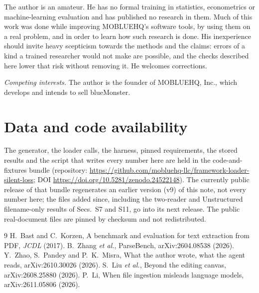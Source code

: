 \documentclass[aps,pre,twocolumn,superscriptaddress,nofootinbib,10pt]{revtex4-2}
\begin{document}
The author is an amateur. He has no formal training in statistics, econometrics or machine-learning evaluation and has published no research in them. Much of this work was done while improving MOBLUEHQ's software tools, by using them on a real problem, and in order to learn how such research is done. His inexperience should invite heavy scepticism towards the methods and the claims: errors of a kind a trained researcher would not make are possible, and the checks described here lower that risk without removing it. He welcomes corrections.

\emph{Competing interests.} The author is the founder of MOBLUEHQ, Inc., which develops and intends to sell blueMonster.

\section*{Data and code availability}
The generator, the loader calls, the harness, pinned requirements, the stored results and the script that writes every number here are held in the code-and-fixtures bundle (repository: \url{https://github.com/mobluehq-llc/framework-loader-silent-loss}; DOI \url{https://doi.org/10.5281/zenodo.24522148}). The currently public release of that bundle regenerates an earlier version (v9) of this note, not every number here; the files added since, including the two-reader and Unstructured filename-only results of Secs.~S7 and S11, go into its next release. The public real-document files are pinned by checksum and not redistributed.

\begin{thebibliography}{9}\footnotesize
{} H.~Bast and C.~Korzen, A benchmark and evaluation for text extraction from PDF, \emph{JCDL} (2017).
 B.~Zhang \emph{et al.}, ParseBench, arXiv:2604.08538 (2026).
 Y.~Zhao, S.~Pandey and P.~K.~Misra, What the author wrote, what the agent reads, arXiv:2610.30026 (2026).
 S.~Liu \emph{et al.}, Beyond the editing canvas, arXiv:2608.25880 (2026).
 P.~Li, When file ingestion misleads language models, arXiv:2611.05806 (2026).
\end{thebibliography}

\clearpage

\end{document}
